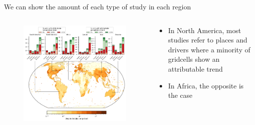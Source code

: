 \documentclass[9pt]{beamer}
\begin{document}
\begin{frame}{We can show the amount of each type of study in each region}

\begin{columns}
	\begin{column}{0.7\linewidth}
		\begin{figure}
			\includegraphics[width=\linewidth]{../plots/maps/study_type_continent.png}
		\end{figure}
	\end{column}
	\begin{column}{0.3\linewidth}
		 \small
		\begin{itemize}
			\item In North America, most studies refer to places and drivers where a minority of gridcells show an attributable trend
			\item In Africa, the opposite is the case
		\end{itemize}
	\end{column}
\end{columns}

\end{frame}
\end{document}

